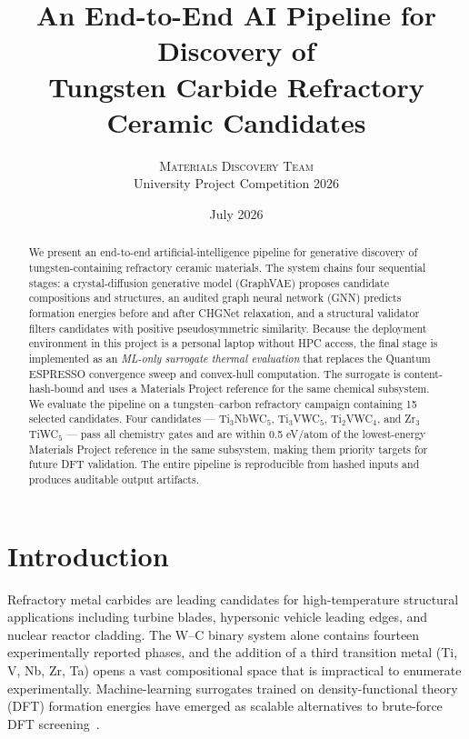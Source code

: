 \documentclass[11pt,a4paper]{article}
\title{\bfseries
  An End-to-End AI Pipeline for Discovery of\\
  Tungsten Carbide Refractory Ceramic Candidates}
\author{
  \textsc{Materials Discovery Team}\\[0.5em]
  \normalsize University Project Competition 2026
}
\date{July 2026}
\begin{document}
\maketitle
\thispagestyle{fancy}

\begin{abstract}
\noindent
We present an end-to-end artificial-intelligence pipeline for generative
discovery of tungsten-containing refractory ceramic materials. The system
chains four sequential stages: a crystal-diffusion generative model
(GraphVAE) proposes candidate compositions and structures, an audited
graph neural network (GNN) predicts formation energies before and after
CHGNet relaxation, and a structural validator filters candidates with
positive pseudosymmetric similarity. Because the deployment environment
in this project is a personal laptop without HPC access, the final stage
is implemented as an \emph{ML-only surrogate thermal evaluation} that
replaces the Quantum ESPRESSO convergence sweep and convex-hull
computation. The surrogate is content-hash-bound and uses a Materials
Project reference for the same chemical subsystem. We evaluate the
pipeline on a tungsten--carbon refractory campaign containing 15
selected candidates. Four candidates --- Ti$_3$NbWC$_5$, Ti$_3$VWC$_5$,
Ti$_2$VWC$_4$, and Zr$_3$TiWC$_5$ --- pass all chemistry gates and are
within 0.5 eV/atom of the lowest-energy Materials Project reference in
the same subsystem, making them priority targets for future
DFT validation. The entire pipeline is reproducible from hashed inputs
and produces auditable output artifacts.
\end{abstract}


\section{Introduction}
\label{sec:intro}

Refractory metal carbides are leading candidates for high-temperature
structural applications including turbine blades, hypersonic vehicle
leading edges, and nuclear reactor cladding. The W--C binary system
alone contains fourteen experimentally reported phases, and the
addition of a third transition metal (Ti, V, Nb, Zr, Ta) opens a vast
compositional space that is impractical to enumerate experimentally.
Machine-learning surrogates trained on density-functional theory (DFT)
formation energies have emerged as scalable alternatives to brute-force
DFT screening~\cite{xie2018crystalgraph,cendrowski2024chgnet}.
\end{document}

